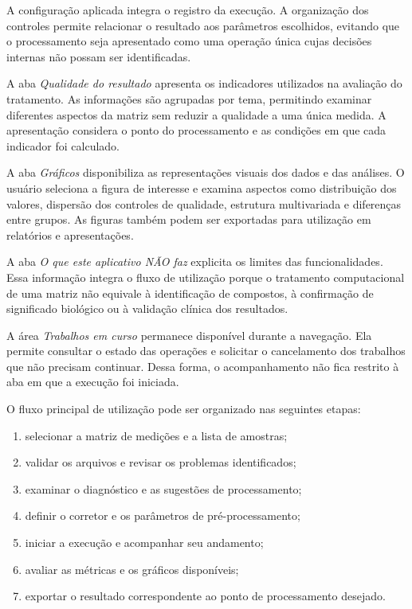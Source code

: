 A configuração aplicada integra o registro da execução. A organização dos controles permite relacionar o resultado aos parâmetros escolhidos, evitando que o processamento seja apresentado como uma operação única cujas decisões internas não possam ser identificadas.

A aba \textit{Qualidade do resultado} apresenta os indicadores utilizados na avaliação do tratamento. As informações são agrupadas por tema, permitindo examinar diferentes aspectos da matriz sem reduzir a qualidade a uma única medida. A apresentação considera o ponto do processamento e as condições em que cada indicador foi calculado.

A aba \textit{Gráficos} disponibiliza as representações visuais dos dados e das análises. O usuário seleciona a figura de interesse e examina aspectos como distribuição dos valores, dispersão dos controles de qualidade, estrutura multivariada e diferenças entre grupos. As figuras também podem ser exportadas para utilização em relatórios e apresentações.

A aba \textit{O que este aplicativo NÃO faz} explicita os limites das funcionalidades. Essa informação integra o fluxo de utilização porque o tratamento computacional de uma matriz não equivale à identificação de compostos, à confirmação de significado biológico ou à validação clínica dos resultados.

A área \textit{Trabalhos em curso} permanece disponível durante a navegação. Ela permite consultar o estado das operações e solicitar o cancelamento dos trabalhos que não precisam continuar. Dessa forma, o acompanhamento não fica restrito à aba em que a execução foi iniciada.

O fluxo principal de utilização pode ser organizado nas seguintes etapas:

\begin{enumerate}
    \item selecionar a matriz de medições e a lista de amostras;
    \item validar os arquivos e revisar os problemas identificados;
    \item examinar o diagnóstico e as sugestões de processamento;
    \item definir o corretor e os parâmetros de pré-processamento;
    \item iniciar a execução e acompanhar seu andamento;
    \item avaliar as métricas e os gráficos disponíveis;
    \item exportar o resultado correspondente ao ponto de processamento desejado.
\end{enumerate}

